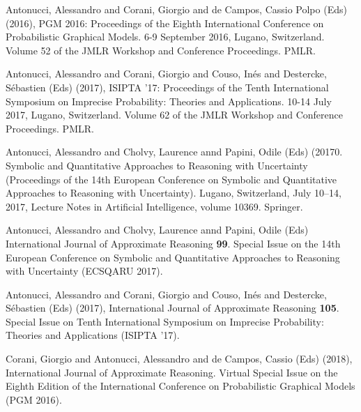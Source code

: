 \begin{cventries}
\begin{cvitems}
\item Antonucci, Alessandro and Corani, Giorgio and de Campos, Cassio Polpo (Eds) (2016), PGM 2016: Proceedings of the Eighth International Conference on Probabilistic Graphical Models. 6-9 September 2016, Lugano, Switzerland. Volume 52 of the JMLR Workshop and Conference Proceedings. PMLR.
\item Antonucci, Alessandro and Corani, Giorgio and Couso, Inés and Destercke, Sébastien (Eds) (2017), ISIPTA '17: Proceedings of the Tenth International Symposium on Imprecise Probability: Theories and Applications. 10-14 July 2017, Lugano, Switzerland. Volume 62 of the JMLR Workshop and Conference Proceedings. PMLR.
\item Antonucci, Alessandro and Cholvy, Laurence annd Papini, Odile (Eds) (20170. Symbolic and Quantitative Approaches to Reasoning with Uncertainty (Proceedings of the 14th European Conference on Symbolic and Quantitative Approaches to Reasoning with Uncertainty). Lugano, Switzerland, July 10–14, 2017, Lecture Notes in Artificial Intelligence, volume 10369. Springer.
\item Antonucci, Alessandro and Cholvy, Laurence annd Papini, Odile (Eds) International Journal of Approximate Reasoning {\bf{99}}. Special Issue on the 14th European Conference on Symbolic and Quantitative Approaches to Reasoning with Uncertainty (ECSQARU 2017).
\item Antonucci, Alessandro and Corani, Giorgio and Couso, Inés and Destercke, Sébastien (Eds) (2017), International Journal of Approximate Reasoning {\bf{105}}. Special Issue on Tenth International Symposium on Imprecise Probability: Theories and Applications (ISIPTA ’17).
\item Corani, Giorgio and Antonucci, Alessandro and de Campos, Cassio (Eds) (2018), International Journal of Approximate Reasoning. Virtual Special Issue on the Eighth Edition of the International Conference on Probabilistic Graphical Models (PGM 2016).
\end{cvitems}
\end{cventries}
